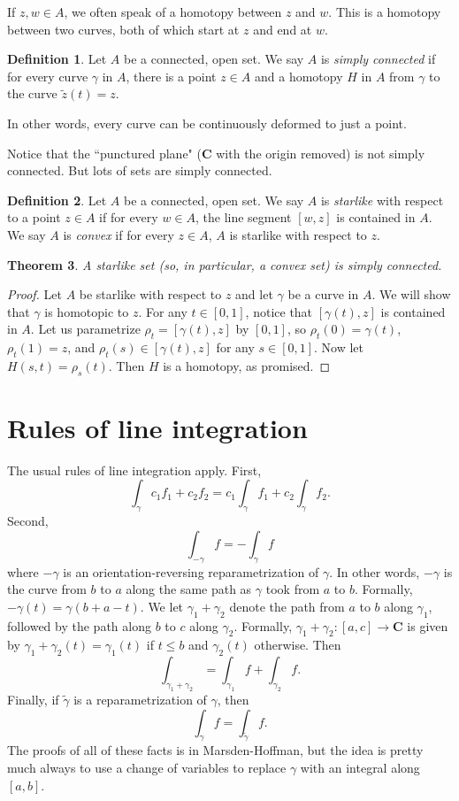 \documentclass[12pt]{report}
\newcommand{\CC}{\mathbf{C}}
\newcommand{\dfn}[1]{\emph{#1}\index{#1}}
\newtheorem{theorem}{Theorem}[chapter]
\theoremstyle{definition}
\newtheorem{definition}[theorem]{Definition}
\theoremstyle{remark}
\begin{document}
If $z,w \in A$, we often speak of a homotopy between $z$ and $w$. This is a homotopy between two curves, both of which start at $z$ and end at $w$.
\begin{definition}
Let $A$ be a connected, open set. We say $A$ is \dfn{simply connected} if for every curve $\gamma$ in $A$, there is a point $z \in A$ and a homotopy $H$ in $A$ from $\gamma$ to the curve $\tilde z(t) = z$.
\end{definition}
In other words, every curve can be continuously deformed to just a point.

Notice that the ``punctured plane" ($\CC$ with the origin removed) is not simply connected. But lots of sets are simply connected. 
\begin{definition}
Let $A$ be a connected, open set. We say $A$ is \dfn{starlike} with respect to a point $z \in A$ if for every $w \in A$, the line segment $[w, z]$ is contained in $A$. We say $A$ is \dfn{convex} if for every $z \in A$, $A$ is starlike with respect to $z$.
\end{definition}
\begin{theorem}
A starlike set (so, in particular, a convex set) is simply connected.
\end{theorem}
\begin{proof}
Let $A$ be starlike with respect to $z$ and let $\gamma$ be a curve in $A$. We will show that $\gamma$ is homotopic to $z$. For any $t \in [0, 1]$, notice that $[\gamma(t), z]$ is contained in $A$. Let us parametrize $\rho_t = [\gamma(t), z]$ by $[0, 1]$, so $\rho_t(0) = \gamma(t)$, $\rho_t(1) = z$, and $\rho_t(s) \in [\gamma(t), z]$ for any $s \in [0, 1]$. Now let $H(s, t) = \rho_s(t)$. Then $H$ is a homotopy, as promised.
\end{proof}


\section{Rules of line integration}
The usual rules of line integration apply. First,
$$\int_\gamma c_1 f_1 + c_2 f_2 = c_1 \int_\gamma f_1 + c_2 \int_\gamma f_2.$$
Second,
$$\int_{-\gamma} f = -\int_\gamma f$$
where $-\gamma$ is an orientation-reversing reparametrization of $\gamma$. In other words, $-\gamma$ is the curve from $b$ to $a$ along the same path as $\gamma$ took from $a$ to $b$. Formally, $-\gamma(t) = \gamma(b + a -t)$.
We let $\gamma_1 + \gamma_2$ denote the path from $a$ to $b$ along $\gamma_1$, followed by the path along $b$ to $c$ along $\gamma_2$. Formally, $\gamma_1 + \gamma_2: [a, c] \to \CC$ is given by $\gamma_1 + \gamma_2(t) = \gamma_1(t)$ if $t \leq b$ and $\gamma_2(t)$ otherwise. Then
$$\int_{\gamma_1 + \gamma_2} = \int_{\gamma_1} f + \int_{\gamma_2} f.$$
Finally, if $\tilde \gamma$ is a reparametrization of $\gamma$, then
$$\int_\gamma f = \int_{\tilde \gamma} f.$$
The proofs of all of these facts is in Marsden-Hoffman, but the idea is pretty much always to use a change of variables to replace $\gamma$ with an integral along $[a, b]$.
\end{document}
